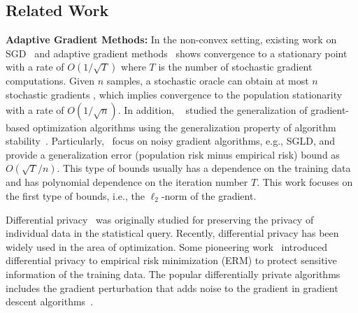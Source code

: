 \documentclass[11pt]{article}
\begin{document}
\subsection{Related Work}
{\bf Adaptive Gradient Methods:} 
In the non-convex setting, existing work on SGD~\citep{ghla2013} and adaptive gradient methods~\citep{zare18, wawu19, zosh2019, cheli2019} 
shows convergence to a stationary point with a rate of  $O(1/\sqrt{T})$
where $T$ is the number of stochastic gradient computations. Given $n$ samples, a stochastic oracle can obtain at most $n$ stochastic gradients
, which implies convergence to the population stationarity with a rate of $O(1/\sqrt{n})$.
In addition, ~\citet{kula2018, rara2017, hare2016,mowa2018, pejo2018, cheli2019, lilu2019} studied 
the generalization of gradient-based optimization algorithms using the generalization property of algorithm stability~\cite{boel02}. Particularly,~\citet{rara2017, mowa2018, lilu2019, pejo2018} focus on noisy gradient algorithms, e.g., SGLD, and provide a generalization error (population risk minus empirical risk) bound as $O(\sqrt{T}/n)$. This type of bounds usually has a dependence on the training data and has polynomial dependence on the iteration number $T$.  This work focuses on the first type of bounds, i.e., the $\ell_2$-norm of the gradient.


\vspace{0.05in}

 Differential privacy~\cite{dwro2014} was originally studied for preserving the privacy of individual data in the statistical query. Recently, differential privacy has been widely used in the area of optimization. Some pioneering work~\citep{chmo2011, basm2014, waye2017} introduced differential privacy to empirical risk minimization (ERM) to protect sensitive information of the training data. The popular differentially private
algorithms includes the gradient perturbation that adds noise to the gradient in gradient descent algorithms~\citep{chmo2011,basm2014,waxu2019}.
\end{document}
